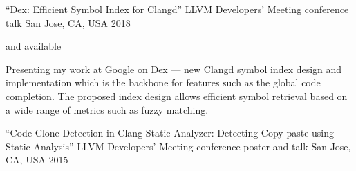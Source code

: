 
\begin{cventries}

  \cventry
    {``Dex: Efficient Symbol Index for Clangd''}
    {LLVM Developers' Meeting conference talk}
    {San Jose, CA, USA}
    {2018}
    {
      \begin{cvitems}
        \item {}
          and  available
        \item Presenting my work at Google on Dex --- new Clangd symbol index
          design and implementation which is the backbone for features such as
          the global code completion. The proposed index design allows
          efficient symbol retrieval based on a wide range of metrics such as
          fuzzy matching.
      \end{cvitems}
    }

  \cventry
    {``Code Clone Detection in Clang Static Analyzer: Detecting Copy-paste using Static Analysis''}
    {LLVM Developers' Meeting conference poster and talk}
    {San Jose, CA, USA}
    {2015}
    {
      \begin{cvitems}
      \end{cvitems}
    }

\end{cventries}
